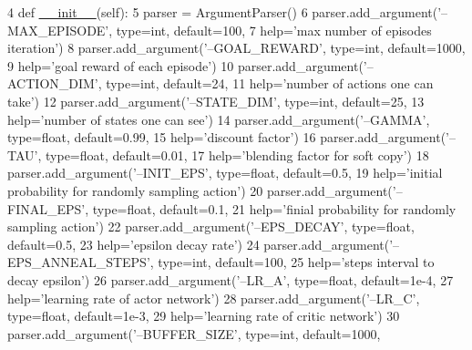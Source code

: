 \begin{DoxyCode}
4     \textcolor{keyword}{def }\hyperlink{classoptions_1_1_options_ad708dd8dd3879087314e2e86c0fad701}{\_\_init\_\_}(self):
5         parser = ArgumentParser()
6         parser.add\_argument(\textcolor{stringliteral}{'--MAX\_EPISODE'}, type=int, default=100,
7                             help=\textcolor{stringliteral}{'max number of episodes iteration'})
8         parser.add\_argument(\textcolor{stringliteral}{'--GOAL\_REWARD'}, type=int, default=1000,
9                             help=\textcolor{stringliteral}{'goal reward of each episode'})
10         parser.add\_argument(\textcolor{stringliteral}{'--ACTION\_DIM'}, type=int, default=24,
11                             help=\textcolor{stringliteral}{'number of actions one can take'})
12         parser.add\_argument(\textcolor{stringliteral}{'--STATE\_DIM'}, type=int, default=25,
13                             help=\textcolor{stringliteral}{'number of states one can see'})
14         parser.add\_argument(\textcolor{stringliteral}{'--GAMMA'}, type=float, default=0.99,
15                             help=\textcolor{stringliteral}{'discount factor'})
16         parser.add\_argument(\textcolor{stringliteral}{'--TAU'}, type=float, default=0.01,
17                             help=\textcolor{stringliteral}{'blending factor for soft copy'})
18         parser.add\_argument(\textcolor{stringliteral}{'--INIT\_EPS'}, type=float, default=0.5,
19                             help=\textcolor{stringliteral}{'initial probability for randomly sampling action'})
20         parser.add\_argument(\textcolor{stringliteral}{'--FINAL\_EPS'}, type=float, default=0.1,
21                             help=\textcolor{stringliteral}{'finial probability for randomly sampling action'})
22         parser.add\_argument(\textcolor{stringliteral}{'--EPS\_DECAY'}, type=float, default=0.5,
23                             help=\textcolor{stringliteral}{'epsilon decay rate'})
24         parser.add\_argument(\textcolor{stringliteral}{'--EPS\_ANNEAL\_STEPS'}, type=int, default=100,
25                             help=\textcolor{stringliteral}{'steps interval to decay epsilon'})
26         parser.add\_argument(\textcolor{stringliteral}{'--LR\_A'}, type=float, default=1e-4,
27                             help=\textcolor{stringliteral}{'learning rate of actor network'})
28         parser.add\_argument(\textcolor{stringliteral}{'--LR\_C'}, type=float, default=1e-3,
29                             help=\textcolor{stringliteral}{'learning rate of critic network'})
30         parser.add\_argument(\textcolor{stringliteral}{'--BUFFER\_SIZE'}, type=int, default=1000,

\end{DoxyCode}
